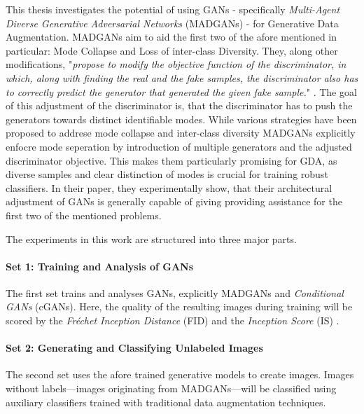 This thesis investigates the potential of using GANs - specifically \textit{Multi-Agent Diverse Generative Adversarial Networks} (MADGANs) \cite{ghosh2018multiagentdiversegenerativeadversarial} - for Generative Data Augmentation. MADGANs aim to aid the first two of the afore mentioned in particular: Mode Collapse and Loss of inter-class Diversity. They, along other modifications, "\textit{propose to modify the objective function of the discriminator, in which, along with finding the real and the fake samples, the discriminator also has to correctly predict the generator that generated the given fake sample.}" \cite{ghosh2018multiagentdiversegenerativeadversarial}. The goal of this adjustment of the discriminator is, that the discriminator has to push the generators towards distinct identifiable modes. While various strategies have been proposed to addrese mode collapse and inter-class diversity MADGANs explicitly enfocre mode seperation by introduction of multiple generators and the adjusted discriminator objective. This makes them particularly promising for GDA, as diverse samples and clear distinction of modes is crucial for training robust classifiers. In their paper, they experimentally show, that their architectural adjustment of GANs is generally capable of giving providing assistance for the first two of the mentioned problems.

The experiments in this work are structured into three major parts.

\paragraph{Set 1: Training and Analysis of GANs}  \label{thesis_goal_1}
The first set trains and analyses GANs, explicitly MADGANs and \textit{Conditional GANs} (cGANs). Here, the quality of the resulting images during training will be scored by the \textit{Fréchet Inception Distance} (FID) \cite{heusel2018ganstrainedtimescaleupdate} and the \textit{Inception Score} (IS) \cite{salimans2016improvedtechniquestraininggans}.

\paragraph{Set 2: Generating and Classifying Unlabeled Images}  \label{thesis_goal_2}
The second set uses the afore trained generative models to create images. Images without labels—images originating from MADGANs—will be classified using auxiliary classifiers trained with traditional data augmentation techniques.

